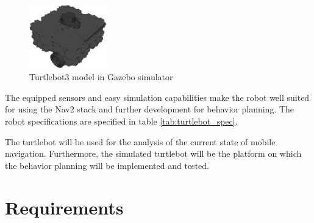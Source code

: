 \begin{figure}[ht]
	\centering
	\includegraphics[width=0.3\textwidth]{images/turtlebot_sim.png}
	\caption{Turtlebot3 model in Gazebo simulator}
	\label{fig:turtlebot}
\end{figure}

The equipped sensors and easy simulation capabilities make the robot well suited for using the Nav2 stack and further development for behavior planning. The robot specifications are specified in table \ref{tab:turtlebot_spec}. 

\begin{table}[ht]
	\centering
	\caption{Turtlebot3 Specifications}
	\label{tab:turtlebot_spec}
	\renewcommand{\arraystretch}{1.5}
\end{table}

The turtlebot will be used for the analysis of the current state of mobile navigation. Furthermore, the simulated turtlebot will be the platform on which the behavior planning will be implemented and tested.

\section{Requirements}
\label{sec:Requirements}

